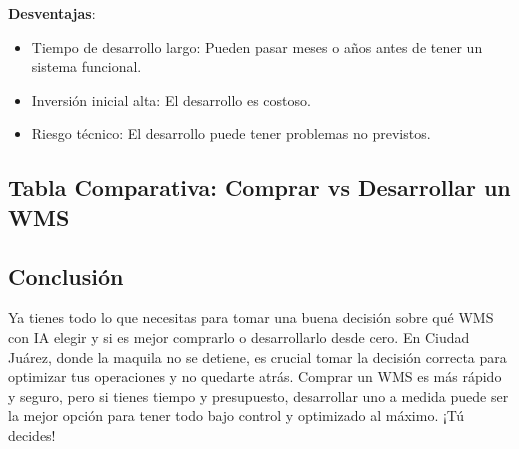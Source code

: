 \textbf{Desventajas}:
\begin{itemize}
    \item Tiempo de desarrollo largo: Pueden pasar meses o años antes de tener un sistema funcional.
    \item Inversión inicial alta: El desarrollo es costoso.
    \item Riesgo técnico: El desarrollo puede tener problemas no previstos.
\end{itemize}

\subsection{Tabla Comparativa: Comprar vs Desarrollar un WMS}

\begin{table}[H]
\centering
\caption{Comparación entre Comprar un WMS con IA vs Desarrollarlo desde Cero}
\end{table}

\subsection{Conclusión}

Ya tienes todo lo que necesitas para tomar una buena decisión sobre qué WMS con IA elegir y si es mejor comprarlo o desarrollarlo desde cero. En Ciudad Juárez, donde la maquila no se detiene, es crucial tomar la decisión correcta para optimizar tus operaciones y no quedarte atrás. Comprar un WMS es más rápido y seguro, pero si tienes tiempo y presupuesto, desarrollar uno a medida puede ser la mejor opción para tener todo bajo control y optimizado al máximo. ¡Tú decides!
